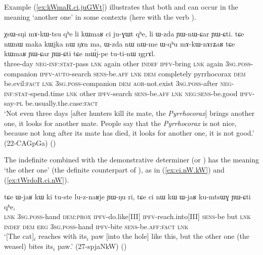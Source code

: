 Example (\ref{ex:kWmaR.ci.juGWt}) illustrates that both  and  can occur in the meaning `another one' in some contexts (here with the verb ).

 \begin{exe}
\ex \label{ex:kWmaR.ci.juGWt}
\gll  χsɯ-sŋi mɤ-kɯ-tsu qʰe li kɯmaʁ ci ju-ɣɯt qʰe, li ɯ-zda ɲɯ-nɯ-ɕar ɲɯ-ɕti. tɕe nɯnɯ maka kɯjka nɯ ŋɤn ma, ɯ-zda nɯ nɯ-me ɯ-qʰu mɤ-kɯ-nɤrʑaʁ tɕe kɯmaʁ ɲɯ-ɕar ɲɯ-ɕti tɕe mɯ́j-pe tu-ti-nɯ ŋgrɤl. \\
three-day \textsc{neg}-\textsc{inf}:\textsc{stat}-pass \textsc{lnk} again other \textsc{indef} \textsc{ipfv}-bring \textsc{lnk} again \textsc{3sg}.\textsc{poss}-companion \textsc{ipfv}-\textsc{auto}-search \textsc{sens}-be.\textsc{aff} \textsc{lnk} \textsc{dem} completely pyrrhocorax \textsc{dem} be.evil:\textsc{fact} \textsc{lnk} \textsc{3sg}.\textsc{poss}-companion \textsc{dem}  \textsc{aor}-not.exist \textsc{3sg}.\textsc{poss}-after \textsc{neg}-\textsc{inf}:\textsc{stat}-spend.time \textsc{lnk} other \textsc{ipfv}-search \textsc{sens}-be.\textsc{aff} \textsc{lnk} \textsc{neg}:\textsc{sens}-be.good \textsc{ipfv}-say-\textsc{pl} be.usually.the.case:\textsc{fact} \\
\glt `Not even three days [after hunters kill its mate, the \textit{Pyrrhocorax}] brings another one, it looks for another mate. People say that the \textit{Pyrrhocorax} is not nice, because not long after its mate has died, it looks for another one, it is not good.' (22-CAGpGa) ()
\end{exe}

The indefinite  combined with the demonstrative determiner  (or ) has the meaning `the other one' (the definite counterpart of ), as in (\ref{ex:ci.nW.kW}) and (\ref{ex:tWrdoR.ci.nW}).

\begin{exe}
\ex \label{ex:ci.nW.kW}
 \gll tɕe ɯ-jaʁ kɯ ki tu-ste lu-z-naʁje ɲɯ-ŋu ri, tɕe ci nɯ kɯ ɯ-jaʁ ku-mtsɯɣ ɲɯ-ɕti qʰe, \\
 \textsc{lnk} \textsc{3sg}.\textsc{poss}-hand \textsc{dem}:\textsc{prox} \textsc{ipfv}-do.like[III]  \textsc{ipfv}-reach.into[III] \textsc{sens}-be but \textsc{lnk} \textsc{indef} \textsc{dem} \textsc{erg} \textsc{3sg}.\textsc{poss}-hand  \textsc{ipfv}-bite \textsc{sens}-be.\textsc{aff}:\textsc{fact} \textsc{lnk} \\
\glt `[The cat]$_i$ reaches with its$_i$ paw [into the hole] like this, but the other one (the weasel) bites its$_i$ paw.' (27-spjaNkW)
()
\end{exe}

